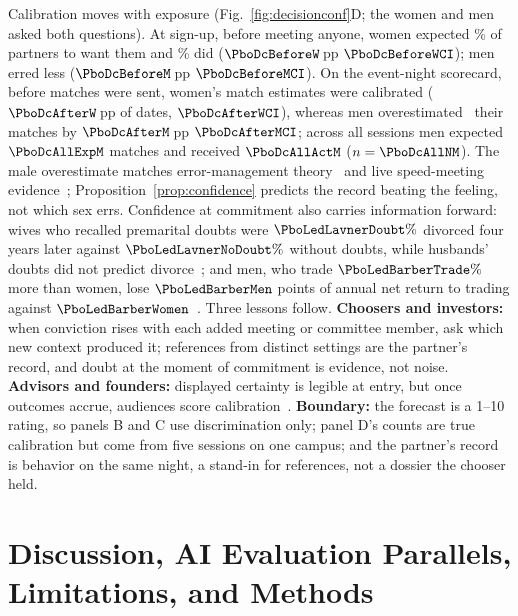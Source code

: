 Calibration moves with exposure (Fig.~\ref{fig:decisionconf}D; the \PboDcCalNW{} women and \PboDcCalNM{} men asked both questions). At sign-up, before meeting anyone, women expected \PboDcExpShareW\% of partners to want them and \PboDcActShareW\% did ($\PboDcBeforeW$\,pp $\PboDcBeforeWCI$); men erred less ($\PboDcBeforeM$\,pp $\PboDcBeforeMCI$). On the event-night scorecard, before matches were sent, women's match estimates were calibrated ($\PboDcAfterW$\,pp of dates, $\PboDcAfterWCI$), whereas men overestimated~\cite{moore2008} their matches by $\PboDcAfterM$\,pp $\PboDcAfterMCI$; across all sessions men expected $\PboDcAllExpM$ matches and received $\PboDcAllActM$ ($n=\PboDcAllNM$). The male overestimate matches error-management theory~\cite{haselton2000} and live speed-meeting evidence~\cite{perilloux2012}; Proposition~\ref{prop:confidence} predicts the record beating the feeling, not which sex errs. Confidence at commitment also carries information forward: wives who recalled premarital doubts were $\PboLedLavnerDoubt\%$ divorced four years later against $\PboLedLavnerNoDoubt\%$ without doubts, while husbands' doubts did not predict divorce~\cite{lavner2012}; and men, who trade $\PboLedBarberTrade\%$ more than women, lose $\PboLedBarberMen$ points of annual net return to trading against $\PboLedBarberWomen$~\cite{barber2001}. Three lessons follow. \textbf{Choosers and investors:} when conviction rises with each added meeting or committee member, ask which new context produced it; references from distinct settings are the partner's record, and doubt at the moment of commitment is evidence, not noise. \textbf{Advisors and founders:} displayed certainty is legible at entry, but once outcomes accrue, audiences score calibration~\cite{tenney2007}. \textbf{Boundary:} the forecast is a 1--10 rating, so panels B and C use discrimination only; panel D's counts are true calibration but come from five sessions on one campus; and the partner's record is behavior on the same night, a stand-in for references, not a dossier the chooser held.

\section{Discussion, AI Evaluation Parallels, Limitations, and Methods}\label{sec:discussion}


